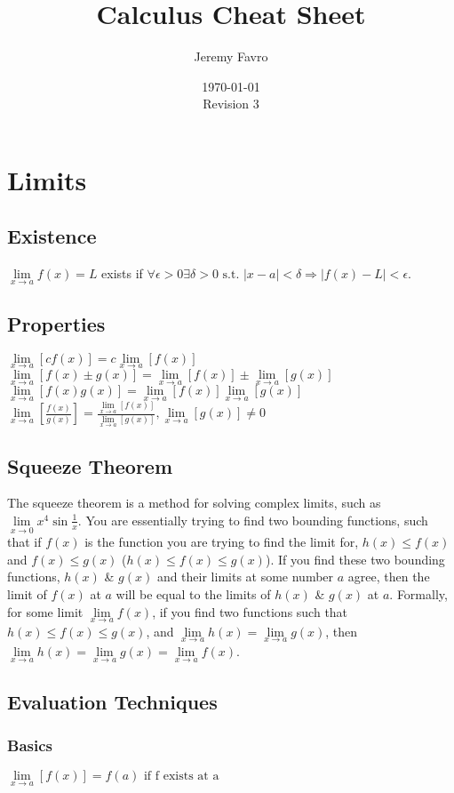 \documentclass[10pt,landscape,letterpaper]{cheatsheet}
\title{Calculus Cheat Sheet}
\author{Jeremy Favro}
\date{\today\\Revision 3}
\begin{document}
\maketitle

\section*{Limits}
\subsection*{Existence}
$\lim\limits_{x\to a}f(x)=L $ exists if $\forall \epsilon > 0 \exists \delta > 0 \text{ s.t. } \left\lvert x-a \right\rvert < \delta \Rightarrow \left\lvert f(x) - L \right\rvert < \epsilon $.
\subsection*{Properties}
$ \lim\limits_{x\to a}[cf(x)]=c\lim\limits_{x\to a}[f(x)] $
$ \lim\limits_{x\to a}[f(x) \pm g(x)]=\lim\limits_{x\to a}[f(x)] \pm \lim\limits_{x\to a}[g(x)] $
$ \lim\limits_{x\to a}[f(x)g(x)]=\lim\limits_{x\to a}[f(x)]\lim\limits_{x\to a}[g(x)] $
$ \lim\limits_{x\to a}\left[\frac{f(x)}{g(x)}\right]=\frac{\lim\limits_{x\to a}[f(x)]}{\lim\limits_{x\to a}[g(x)]}, \lim\limits_{x\to a}[g(x)] \neq 0 $
\subsection*{Squeeze Theorem}
The squeeze theorem is a method for solving complex limits, such as $\lim\limits_{x\to 0}{x^4}\sin {\frac{1}{x}}$. You are essentially trying to find two bounding functions,
such that if $f(x)$ is the function you are trying to find the limit for, $h(x) \leq f(x)$ and $f(x) \leq g(x)$ ($h(x) \leq f(x) \leq g(x)$).
If you find these two bounding functions, $h(x)$ \& $g(x)$ and their limits at some number $a$ agree, then the limit of $f(x)$ at $a$ will be equal to the limits of $h(x)$ \& $g(x)$ at $a$.
Formally, for some limit $\lim\limits_{x\to a}f(x)$, if you find two functions such that $h(x) \leq f(x) \leq g(x)$, and $\lim\limits_{x\to a}h(x)=\lim\limits_{x\to a}g(x)$, then $\lim\limits_{x\to a}h(x)=\lim\limits_{x\to a}g(x)=\lim\limits_{x\to a}f(x)$.
\subsection*{Evaluation Techniques}

\subsubsection*{Basics}
$ \lim\limits_{x\to a}\left[f(x)\right]=f(a) \text{ if f exists at a } $
\end{document}

